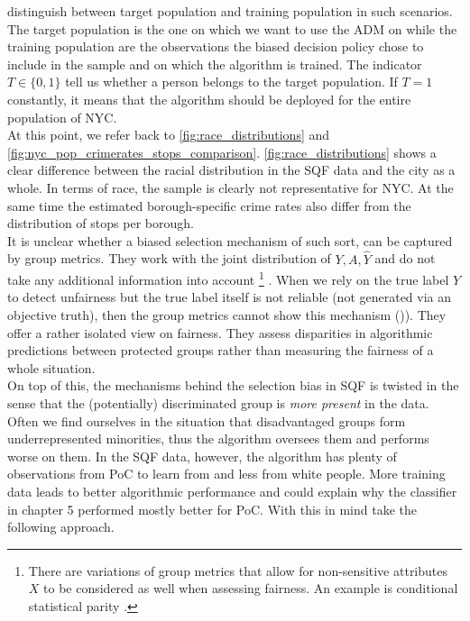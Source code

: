 \cite{kallus2018} distinguish between target population and training population in such scenarios. The target population is the one on which we want to use the ADM on while the training population are the observations the biased decision policy chose to include in the sample and on which the algorithm is trained. The indicator $T \in \{0, 1\}$ tell us whether a person belongs to the target population. If $T = 1$ constantly, it means that the algorithm should be deployed for the entire population of NYC.\\
At this point, we refer back to \autoref{fig:race_distributions} and \autoref{fig:nyc_pop_crimerates_stops_comparison}. \autoref{fig:race_distributions} shows a clear difference between the racial distribution in the SQF data and the city as a whole. In terms of race, the sample is clearly not representative for NYC. At the same time the estimated borough-specific crime rates also differ from the distribution of stops per borough. \\

It is unclear whether a biased selection mechanism of such sort, can be captured by group metrics. They work with the joint distribution of $Y, A, \hat{Y}$ and do not take any additional information into account \footnote{There are variations of group metrics that allow for non-sensitive attributes $X$ to be considered as well when assessing fairness. An example is conditional statistical parity \cite{verma2018}.} . When we rely on the true label $Y$ to detect unfairness but the true label itself is not reliable (not generated via an objective truth), then the group metrics cannot show this mechanism ()\cite{castelnovo2022}). They offer a rather isolated view on fairness. They assess disparities in algorithmic predictions between protected groups rather than measuring the fairness of a whole situation.\\
On top of this, the mechanisms behind the selection bias in SQF is twisted in the sense that the (potentially) discriminated group is \textit{more present} in the data. Often we find ourselves in the situation that disadvantaged groups form underrepresented minorities, thus the algorithm oversees them and performs worse on them. In the SQF data, however, the algorithm has plenty of observations from PoC to learn from and less from white people. More training data leads to better algorithmic performance and could explain why the classifier in chapter 5 performed mostly better for PoC. With this in mind \cite{kallus2018} take the following approach.\\


